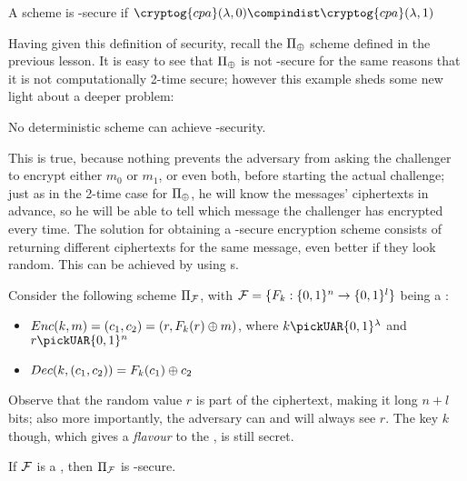 \begin{definition}
    A scheme is \cpa-secure if $\cryptog{cpa}(\lambda, 0) \compindist \cryptog{cpa}(\lambda, 1)$
\end{definition}


Having given this definition of security, recall the $\Pi_{\oplus}$ scheme defined in the previous lesson. It is easy to see that $\Pi_{\oplus}$ is not \cpa-secure for the same reasons that it is not computationally 2-time secure; however this example sheds some new light about a deeper problem:

\begin{observation}
    No deterministic scheme can achieve \cpa-security.
\end{observation}

This is true, because nothing prevents the adversary from asking the challenger to encrypt either $m_0$ or $m_1$, or even both, before starting the actual challenge; just as in the 2-time case for $\Pi_{\oplus}$, he will know the messages' ciphertexts in advance, so he will be able to tell which message the challenger has encrypted every time. The solution for obtaining a \cpa-secure encryption scheme consists of returning different ciphertexts for the same message, even better if they look random. This can be achieved by using \prf{}s.

Consider the following \ske{} scheme $\Pi_{\mathcal{F}}$, with $\mathcal{F}=\{ F_{k}:\{0,1\}^{n} \to \{0,1\}^{l} \}$ being a \prf:

\begin{itemize}
    \item $Enc(k, m) = (c_1, c_2) = (r, F_k(r) \oplus m)$, where $k \pickUAR \{0,1\}^\lambda$ and $r \pickUAR \{0,1\}^n$
    
    \item $Dec(k, (c_{1}, c_{2}))=F_{k}(c_{1}) \oplus c_{2}$
\end{itemize}

Observe that the random value $r$ is part of the ciphertext, making it long $n+l$ bits; also more importantly, the adversary can and will always see $r$. The key $k$ though, which gives a \textit{flavour} to the \prf, is still secret.

\begin{theorem} \label{thm:prfcpa}
    If $\mathcal{F}$ is a \prf, then $\Pi_{\mathcal{F}}$ is \cpa-secure.
\end{theorem}

